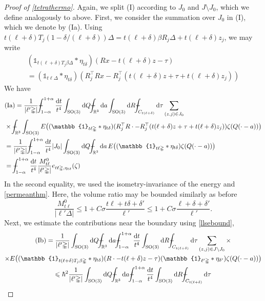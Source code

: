 \documentclass[final,onefignum,onetabnum,reqno]{amsart}
\theoremstyle{remark}
\renewcommand{\le}{\leqslant}
\newcommand{\RR}{\mathbb{R}}
\newcommand{\SO}{\mathrm{SO}}
\newcommand{\iden}{\mathbb{1}} %
\newcommand{\tetra}{\mathbb{\Delta}} %
\newcommand{\dd}{\mathrm{d}} %
\def\Xint#1{\mathchoice
{\XXint\displaystyle\textstyle{#1}}%
{\XXint\textstyle\scriptstyle{#1}}%
{\XXint\scriptstyle\scriptscriptstyle{#1}}%
{\XXint\scriptscriptstyle\scriptscriptstyle{#1}}%
\!\int}
\def\XXint#1#2#3{{\setbox0=\hbox{$#1{#2#3}{\int}$ }
\vcenter{\hbox{$#2#3$ }}\kern-.6\wd0}}
\def\dashint{\Xint-}
\begin{document}
\begin{proof}[Proof of \cref{tetrathermo}]
Again, we split (I) according to $J_0$ and $J\setminus J_0$, which we define analogously to above.
First, we consider the summation over $J_0$ in (I), which we denote by (Ia).
Using $t(\ell+\delta) T_j(1-\delta/(\ell+\delta))\tetra=t(\ell+\delta)\beta R_j\tetra + t(\ell+\delta) z_j$, we may write
\begin{multline*}
(\iden_{t(\ell+\delta) T_j\beta\tetra} * \eta_{t\delta})(Rx - t(\ell+\delta) z - \tau)\\
=(\iden_{t\ell\tetra} * \eta_{t\delta})(R_j^\top Rx - R_j^\top(t(\ell+\delta) z + \tau + t(\ell+\delta) z_j))
\end{multline*}
We have
\begin{align*}
&\mathrm{(Ia)}=\frac{1}{|\ell'\tetra|} \dashint_{1-\alpha}^{1+\alpha}\frac{\dd t}{t^4}  \int_{\SO(3)}\dd Q \dashint_{\RR^3}\dd a \int_{\SO(3)}\dd R \dashint_{C_{t(\ell+\delta)}}\dd\tau\sum_{(z,j)\in J_0}\\
	&\times \dashint_{\RR^3}\int_{\SO(3)} E\bigl((\iden_{t\ell\tetra} * \eta_{t\delta})(R_j^\top R\cdot - R_j^\top(t(\ell+\delta) z + \tau + t(\ell+\delta) z_j))\zeta(Q(\cdot - a))\bigr)\\
&=\frac{1}{|\ell'\tetra|} \dashint_{1-\alpha}^{1+\alpha}\frac{\dd t}{t^4} |J_0|
	\int_{\SO(3)}\dd Q \dashint_{\RR^3}\dd a\,  E\bigl((\iden_{t\ell\tetra} * \eta_{t\delta})\zeta( Q(\cdot- a))\bigr)\\
	&=\dashint_{1-\alpha}^{1+\alpha}\frac{\dd t}{t^4} \frac{M_{t\ell}^0}{|\ell'\tetra|} e_{t\ell\tetra,\eta_{t\delta}}(\zeta)
\end{align*}
In the second equality, we used the isometry-invariance of the energy and \cref{permeanthm}.
Here, the volume ratio may be bounded similarly as before
$$
\frac{M_{t\ell}^0}{|\ell'\tetra|}\le 1+C\sigma\frac{t\ell+t\delta+\delta'}{\ell'}\le 1+C\sigma\frac{\ell+\delta+\delta'}{\ell'}.
$$
Next, we estimate the contributions near the boundary using \cref{llsebound},
\begin{multline*}
\mathrm{(Ib)}=\frac{1}{|\ell'\tetra|}\int_{\SO(3)}\dd Q \dashint_{\RR^3}\dd a \dashint_{1-\alpha}^{1+\alpha}\frac{\dd t}{t^4} \int_{\SO(3)}\dd R \dashint_{C_{t(\ell+\delta)}}\dd\tau
\sum_{(z,j)\in J\setminus J_0} \times\\
	\times E\bigl((\iden_{t(\ell+\delta) T_j \beta\tetra} * \eta_{t\delta})(R\cdot - t(\ell+\delta) z - \tau)(\iden_{\ell'\tetra}*\eta_{\delta'})\zeta(Q(\cdot - a))\bigr)\\
\le \hbar^2\frac{1}{|\ell'\tetra|}\int_{\SO(3)}\dd Q \dashint_{\RR^3}\dd a \dashint_{1-\alpha}^{1+\alpha}\frac{\dd t}{t^4} \int_{\SO(3)}\dd R \dashint_{C_{t(\ell+\delta)}}\dd\tau

\end{multline*}
\end{proof}
\end{document}
